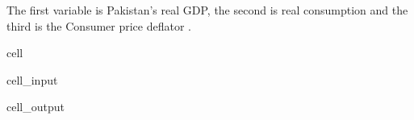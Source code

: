 \documentclass[letterpaper,10pt,english]{jupyterBook}
\begin{document}
\sphinxAtStartPar
The first variable  is Pakistan’s real GDP, the second  is real consumption and the third is the Consumer price deflator .

\begin{sphinxuseclass}{cell}\begin{sphinxVerbatimInput}

\begin{sphinxuseclass}{cell_input}
\begin{sphinxVerbatim}[commandchars=\\\{\}]
\PYG{p}{[}\PYG{p}{]}
\end{sphinxVerbatim}

\end{sphinxuseclass}\end{sphinxVerbatimInput}
\begin{sphinxVerbatimOutput}

\begin{sphinxuseclass}{cell_output}
\noindent{}

\end{sphinxuseclass}\end{sphinxVerbatimOutput}

\end{sphinxuseclass}
\end{document}
